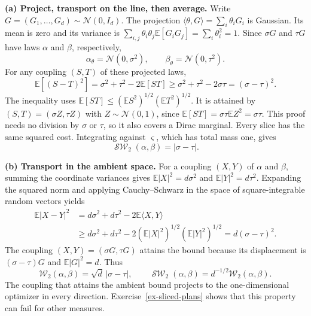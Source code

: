 \documentclass[11pt,a4paper]{article}
\theoremstyle{exostyle}
\newcommand{\Wtwo}{\mathcal{W}_2}
\newcommand{\ip}[2]{\langle #1,#2\rangle}
\DeclareMathOperator{\SW}{\mathcal{SW}}
\newcommand{\EE}{\mathbb E}
\newcommand{\Gauss}{\mathcal N}
\begin{document}
\begin{solution}
\textbf{(a) Project, transport on the line, then average.}
Write $G=(G_1,\ldots,G_d)\sim\Gauss(0,I_d)$.
The projection $\ip{\theta}{G}=\sum_i\theta_iG_i$ is Gaussian. Its mean
is zero and its variance is
$\sum_{i,j}\theta_i\theta_j\EE[G_iG_j]=\sum_i\theta_i^2=1$.
Since $\sigma G$ and $\tau G$ have laws $\alpha$ and $\beta$, respectively,
\[
  \alpha_\theta=\Gauss(0,\sigma^2),\qquad
  \beta_\theta=\Gauss(0,\tau^2).
\]
For any coupling $(S,T)$ of these projected laws,
\[
  \EE[(S-T)^2]=\sigma^2+\tau^2-2\EE[ST]
        \geq\sigma^2+\tau^2-2\sigma\tau=(\sigma-\tau)^2.
\]
The inequality uses $\EE[ST]\leq(\EE S^2)^{1/2}(\EE T^2)^{1/2}$.
It is attained by $(S,T)=(\sigma Z,\tau Z)$ with
$Z\sim\Gauss(0,1)$, since $\EE[ST]=\sigma\tau\EE Z^2=\sigma\tau$.
This proof needs no division by $\sigma$ or $\tau$, so it also covers
a Dirac marginal. Every slice has the same squared cost. Integrating
against $\varsigma$, which has total mass one, gives
\[
  \boxed{\SW_2(\alpha,\beta)=|\sigma-\tau|.}
\]

\par{}
\textbf{(b) Transport in the ambient space.}
For a coupling $(X,Y)$ of $\alpha$ and $\beta$, summing the coordinate
variances gives $\EE|X|^2=d\sigma^2$ and $\EE|Y|^2=d\tau^2$. Expanding
the squared norm and applying Cauchy--Schwarz in the space of
square-integrable random vectors yields
\begin{align*}
  \EE|X-Y|^2
    &=d\sigma^2+d\tau^2-2\EE\ip{X}{Y}\\
    &\geq d\sigma^2+d\tau^2
            -2(\EE|X|^2)^{1/2}(\EE|Y|^2)^{1/2}
     =d(\sigma-\tau)^2.
\end{align*}
The coupling $(X,Y)=(\sigma G,\tau G)$ attains the bound because its
displacement is $(\sigma-\tau)G$ and $\EE|G|^2=d$. Thus
\[
  \boxed{\Wtwo(\alpha,\beta)=\sqrt d\,|\sigma-\tau|,\qquad
    \SW_2(\alpha,\beta)=d^{-1/2}\Wtwo(\alpha,\beta).}
\]
The coupling that attains the ambient bound projects to the
one-dimensional optimizer in every direction. Exercise~\ref{ex-sliced-plans}
shows that this property can fail for other measures.
\end{solution}
\end{document}
